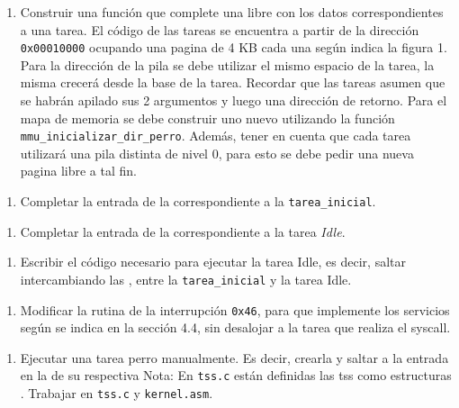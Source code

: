    \begin{enumerate}[resume,label=(\alph*)]
      \item Construir una función que complete una  libre con los datos correspondientes a una tarea. El código de las tareas se encuentra a partir de la dirección \texttt{0x00010000} ocupando una pagina de 4 KB cada una según indica la figura 1. Para la dirección de la pila se debe utilizar el mismo espacio de la tarea, la misma crecerá desde la base de la tarea. Recordar que las tareas asumen que se habrán apilado sus 2 argumentos y luego una dirección de retorno. Para el mapa de memoria se debe construir uno nuevo utilizando la función \texttt{mmu\_inicializar\_dir\_perro}. Además, tener en cuenta que cada tarea utilizará una pila distinta de nivel 0, para esto se debe pedir una nueva pagina libre a tal fin.
    \end{enumerate}

    \begin{enumerate}[resume,label=(\alph*)]
      \item Completar la entrada de la  correspondiente a la \texttt{tarea\_inicial}.
    \end{enumerate}

    \begin{enumerate}[resume,label=(\alph*)]
      \item Completar la entrada de la  correspondiente a la tarea \emph{Idle}.
    \end{enumerate}

    \begin{enumerate}[resume,label=(\alph*)]
      \item Escribir el código necesario para ejecutar la tarea Idle, es decir, saltar intercambiando las , entre la \texttt{tarea\_inicial} y la tarea Idle.
    \end{enumerate}

    \begin{enumerate}[resume,label=(\alph*)]
      \item Modificar la rutina de la interrupción \texttt{0x46}, para que implemente los servicios según se indica en la sección 4.4, sin desalojar a la tarea que realiza el syscall.
    \end{enumerate}

    \begin{enumerate}[resume,label=(\alph*)]
      \item Ejecutar una tarea perro manualmente. Es decir, crearla y saltar a la entrada en la  de su respectiva 
      Nota: En \texttt{tss.c} están definidas las tss como estructuras . Trabajar en \texttt{tss.c} y \texttt{kernel.asm}.
    \end{enumerate}
  
